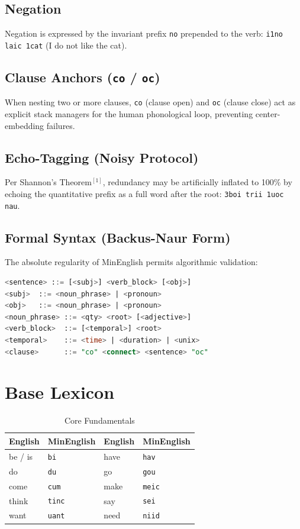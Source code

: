 \documentclass[10pt,twocolumn,letterpaper]{article}
\newcommand{\me}[1]{\texttt{#1}}
\begin{document}
\subsection{Negation}
Negation is expressed by the invariant prefix \me{no} prepended to the verb:
\me{i1no laic 1cat} (I do not like the cat).

\subsection{Clause Anchors (\me{co} / \me{oc})}
When nesting two or more clauses, \me{co} (clause open) and \me{oc} (clause close) act as explicit stack managers for the human phonological loop, preventing center-embedding failures.

\subsection{Echo-Tagging (Noisy Protocol)}
Per Shannon's Theorem$^{[1]}$, redundancy may be artificially inflated to 100\% by echoing the quantitative prefix as a full word after the root: \me{3boi trii 1uoc nau}.

\subsection{Formal Syntax (Backus-Naur Form)}
The absolute regularity of MinEnglish permits algorithmic validation:

\begin{lstlisting}[language=SQL]
<sentence> ::= [<subj>] <verb_block> [<obj>]
<subj>  ::= <noun_phrase> | <pronoun>
<obj>   ::= <noun_phrase> | <pronoun>
<noun_phrase> ::= <qty> <root> [<adjective>]
<verb_block>  ::= [<temporal>] <root>
<temporal>    ::= <time> | <duration> | <unix>
<clause>      ::= "co" <connect> <sentence> "oc"
\end{lstlisting}

\section{Base Lexicon}

\begin{table}[h!]
\centering\small
\begin{tabularx}{\linewidth}{lXlX}
\toprule
\textbf{English} & \textbf{MinEnglish} & \textbf{English} & \textbf{MinEnglish} \\
\midrule
be / is & \me{bi}   & have   & \me{hav}   \\
do      & \me{du}   & go     & \me{gou}   \\
come    & \me{cum}  & make   & \me{meic}  \\
think   & \me{tinc} & say    & \me{sei}   \\
want    & \me{uant} & need   & \me{niid}  \\
\bottomrule
\end{tabularx}
\caption{Core Fundamentals}
\end{table}
\end{document}
